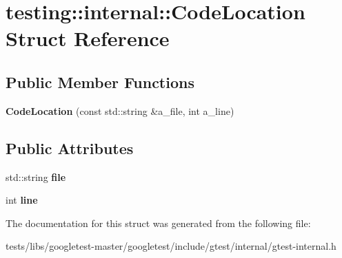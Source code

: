 \hypertarget{structtesting_1_1internal_1_1CodeLocation}{}\section{testing\+:\+:internal\+:\+:Code\+Location Struct Reference}
\label{structtesting_1_1internal_1_1CodeLocation}
\subsection*{Public Member Functions}
\begin{DoxyCompactItemize}
\item 
\mbox{\label{structtesting_1_1internal_1_1CodeLocation_a323a11851c81629d632c47b9b767b8ac}} 
{\bfseries Code\+Location} (const std\+::string \&a\+\_\+file, int a\+\_\+line)
\end{DoxyCompactItemize}
\subsection*{Public Attributes}
\begin{DoxyCompactItemize}
\item 
\mbox{\label{structtesting_1_1internal_1_1CodeLocation_a38118056ad3c11359920274e393bc6b3}} 
std\+::string {\bfseries file}
\item 
\mbox{\label{structtesting_1_1internal_1_1CodeLocation_a01c977c7e8834a05a6d6c40b0c416045}} 
int {\bfseries line}
\end{DoxyCompactItemize}


The documentation for this struct was generated from the following file\+:\begin{DoxyCompactItemize}
\item 
tests/libs/googletest-\/master/googletest/include/gtest/internal/gtest-\/internal.\+h\end{DoxyCompactItemize}
